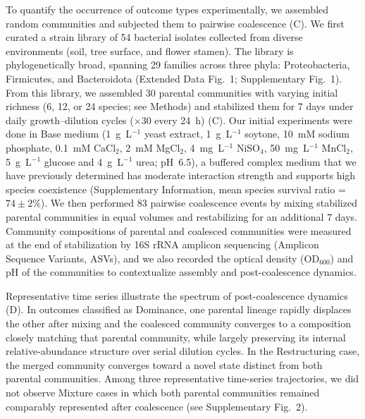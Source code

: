 To quantify the occurrence of outcome types experimentally, we assembled random  communities and subjected them to pairwise coalescence (C). We first curated a strain library of 54 bacterial isolates collected from diverse environments (soil, tree surface, and flower stamen). The library is phylogenetically broad, spanning 29 families across three phyla: Proteobacteria, Firmicutes, and Bacteroidota (Extended Data Fig.~1; Supplementary Fig.~1). From this library, we assembled 30 parental communities with varying initial richness (6, 12, or 24 species; see Methods) and stabilized them for 7 days under daily growth--dilution cycles ($\times$30 every 24~h) (C). Our initial experiments were done in Base medium (1~g~L$^{-1}$ yeast extract, 1~g~L$^{-1}$ soytone, 10~mM sodium phosphate, 0.1~mM CaCl$_2$, 2~mM MgCl$_2$, 4~mg~L$^{-1}$ NiSO$_4$, 50~mg~L$^{-1}$ MnCl$_2$, 5~g~L$^{-1}$ glucose and 4~g~L$^{-1}$ urea; pH~6.5), a buffered complex medium that we have previously determined has moderate interaction strength and supports high species coexistence (Supplementary Information, mean species survival ratio = $74 \pm 2$\%). We then performed 83 pairwise coalescence events by mixing stabilized parental communities in equal volumes and restabilizing for an additional 7 days. Community compositions of parental and coalesced communities were measured at the end of stabilization by 16S rRNA amplicon sequencing (Amplicon Sequence Variants, ASVs), and we also recorded the optical density (OD$_{600}$) and pH of the communities to contextualize assembly and post-coalescence dynamics.

Representative time series illustrate the spectrum of post-coalescence dynamics (D). In outcomes classified as Dominance, one parental lineage rapidly displaces the other after mixing and the coalesced community converges to a composition closely matching that parental community, while largely preserving its internal relative-abundance structure over serial dilution cycles. In the Restructuring case, the merged community converges toward a novel state distinct from both parental communities. Among three representative time-series trajectories, we did not observe Mixture cases in which both parental communities remained comparably represented after coalescence (see Supplementary Fig.~2).

